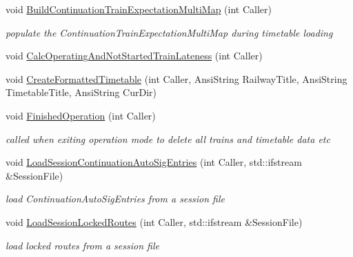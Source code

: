 \begin{DoxyCompactItemize}
void \mbox{\hyperlink{class_t_train_controller_a0445987b1a355de3aef2c21b66d1ed8b}{Build\+Continuation\+Train\+Expectation\+Multi\+Map}} (int Caller)
\begin{DoxyCompactList}\small\item\em populate the Continuation\+Train\+Expectation\+Multi\+Map during timetable loading \end{DoxyCompactList}\item 
void \mbox{\hyperlink{class_t_train_controller_aadffada34a23350d7773bc7735e423a1}{Calc\+Operating\+And\+Not\+Started\+Train\+Lateness}} (int Caller)
\item 
void \mbox{\hyperlink{class_t_train_controller_a4ab4b6a568064d27c65f0770e5a5ccd0}{Create\+Formatted\+Timetable}} (int Caller, Ansi\+String Railway\+Title, Ansi\+String Timetable\+Title, Ansi\+String Cur\+Dir)
\item 
\mbox{\label{class_t_train_controller_a07d3d10bf08d4e916b652d676c917335}} 
void \mbox{\hyperlink{class_t_train_controller_a07d3d10bf08d4e916b652d676c917335}{Finished\+Operation}} (int Caller)
\begin{DoxyCompactList}\small\item\em called when exiting operation mode to delete all trains and timetable data etc \end{DoxyCompactList}\item 
\mbox{\label{class_t_train_controller_ae30ca688c6c3672e98692a13f29b7a4b}} 
void \mbox{\hyperlink{class_t_train_controller_ae30ca688c6c3672e98692a13f29b7a4b}{Load\+Session\+Continuation\+Auto\+Sig\+Entries}} (int Caller, std\+::ifstream \&Session\+File)
\begin{DoxyCompactList}\small\item\em load Continuation\+Auto\+Sig\+Entries from a session file \end{DoxyCompactList}\item 
\mbox{\label{class_t_train_controller_aefaafd5c6d1c51b4db9dd4b3646d0312}} 
void \mbox{\hyperlink{class_t_train_controller_aefaafd5c6d1c51b4db9dd4b3646d0312}{Load\+Session\+Locked\+Routes}} (int Caller, std\+::ifstream \&Session\+File)
\begin{DoxyCompactList}\small\item\em load locked routes from a session file \end{DoxyCompactList}\item 

\end{DoxyCompactItemize}
